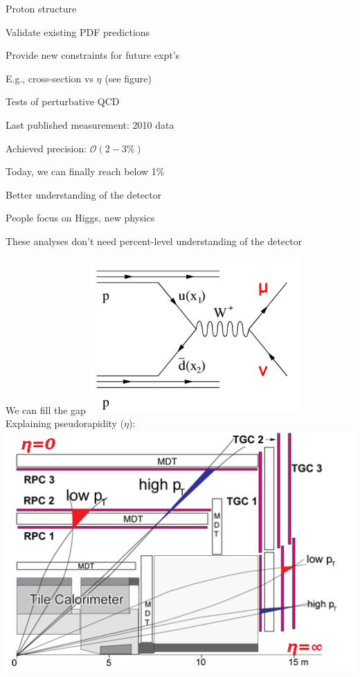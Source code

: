 {
\colb[T]
\centering
\iteb
\item Proton structure
\iteb
\item Validate existing PDF predictions
\item Provide new constraints for future expt's
\item E.g., cross-section vs $\eta$ (see figure)
\itee
\item Tests of perturbative QCD
\iteb
\item Last published measurement: 2010 data
\item Achieved precision: $\mathcal{O}(2-3\%)$
\item Today, we can finally reach below 1\%
\itee
\item Better understanding of the detector
\iteb
\item People focus on Higgs, new physics
\item These analyses don't need percent-level understanding of the detector
\item We can fill the gap
\itee
\itee
{}
\centering
\includegraphics[width=0.6\textwidth]{dates/mtg/figures/wz/wmunuf} \\
\tiny{ Explaining pseudorapidity ($\eta$): } \\
\includegraphics[width=1.0\textwidth]{dates/mtg/figures/wz/eta} \\
\cole
}

